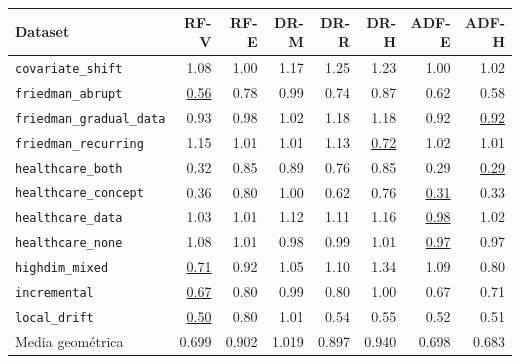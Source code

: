 \begin{tabular*}{\textwidth}{@{\extracolsep{\fill}} l rrrrrrr}
\toprule
Dataset & {RF-V} & {RF-E} & {DR-M} & {DR-R} & {DR-H} & {ADF-E} & {ADF-H} \\
\midrule
\texttt{covariate\_shift} & 1.08 & 1.00 & 1.17 & 1.25 & 1.23 & 1.00 & 1.02 \\
\texttt{friedman\_abrupt} & \underline{0.56} & 0.78 & 0.99 & 0.74 & 0.87 & 0.62 & 0.58 \\
\texttt{friedman\_gradual\_data} & 0.93 & 0.98 & 1.02 & 1.18 & 1.18 & 0.92 & \underline{0.92} \\
\texttt{friedman\_recurring} & 1.15 & 1.01 & 1.01 & 1.13 & \underline{0.72} & 1.02 & 1.01 \\
\texttt{healthcare\_both} & 0.32 & 0.85 & 0.89 & 0.76 & 0.85 & 0.29 & \underline{0.29} \\
\texttt{healthcare\_concept} & 0.36 & 0.80 & 1.00 & 0.62 & 0.76 & \underline{0.31} & 0.33 \\
\texttt{healthcare\_data} & 1.03 & 1.01 & 1.12 & 1.11 & 1.16 & \underline{0.98} & 1.02 \\
\texttt{healthcare\_none} & 1.08 & 1.01 & 0.98 & 0.99 & 1.01 & \underline{0.97} & 0.97 \\
\texttt{highdim\_mixed} & \underline{0.71} & 0.92 & 1.05 & 1.10 & 1.34 & 1.09 & 0.80 \\
\texttt{incremental} & \underline{0.67} & 0.80 & 0.99 & 0.80 & 1.00 & 0.67 & 0.71 \\
\texttt{local\_drift} & \underline{0.50} & 0.80 & 1.01 & 0.54 & 0.55 & 0.52 & 0.51 \\
\midrule
Media geométrica & 0.699 & 0.902 & 1.019 & 0.897 & 0.940 & 0.698 & 0.683 \\
\bottomrule
\end{tabular*}
